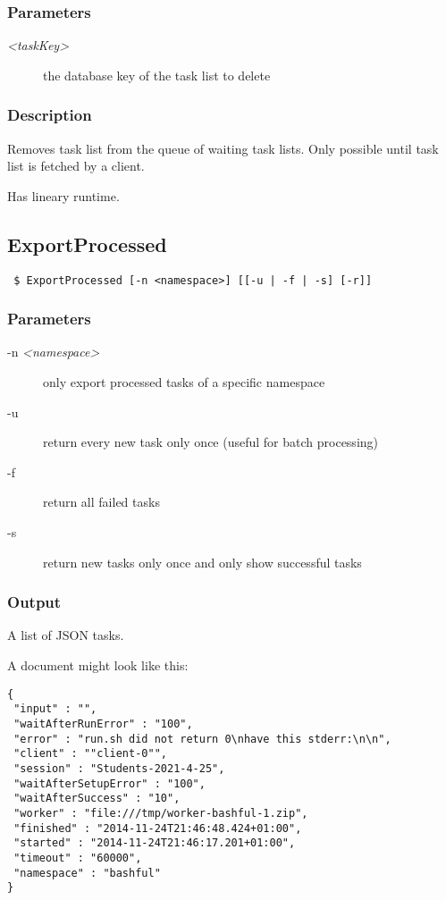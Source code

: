 \documentclass[a4paper,11pt]{article}
\begin{document}
\subsubsection{Parameters}
\begin{description}
\item[\textit{<taskKey>}] the database key of the task list to delete
\end{description}

\subsubsection{Description}
Removes task list from the queue of waiting task lists. Only possible until task list is fetched by a client.

Has lineary runtime.

\newpage


\subsection{ExportProcessed\label{cmd:ExportProcessed}}
\begin{verbatim}
 $ ExportProcessed [-n <namespace>] [[-u | -f | -s] [-r]]
\end{verbatim}

\subsubsection{Parameters}
\begin{description}
\item[-n \textit{<namespace>}] only export processed tasks of a specific namespace
\item[-u] return every new task only once (useful for batch processing)
\item[-f] return all failed tasks
\item[-s] return new tasks only once and only show successful tasks
\end{description}

\subsubsection{Output}
A list of JSON tasks.

A document might look like this:

\begin{verbatim}
{
 "input" : "",
 "waitAfterRunError" : "100",
 "error" : "run.sh did not return 0\nhave this stderr:\n\n",
 "client" : ""client-0"",
 "session" : "Students-2021-4-25",
 "waitAfterSetupError" : "100",
 "waitAfterSuccess" : "10",
 "worker" : "file:///tmp/worker-bashful-1.zip",
 "finished" : "2014-11-24T21:46:48.424+01:00",
 "started" : "2014-11-24T21:46:17.201+01:00",
 "timeout" : "60000",
 "namespace" : "bashful"
}
\end{verbatim}
\end{document}
